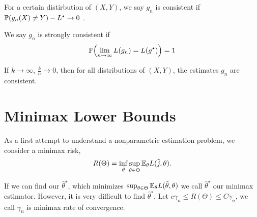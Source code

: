 \begin{defn}
  \label{defn:nearest_neighbour_classification:2}
  For a certain distirbution of $(X, Y)$, we say $g_{n}$ is consistent
  if $\Prob{g_{n}(X) \neq Y} - L^{\star} \rightarrow 0$ .

  We say $g_{n}$ is strongly consistent if
  \begin{equation}
    \label{eq:97}
    \Prob{\lim_{n \rightarrow \infty} L(g_{n}) = L(g^{\star})} = 1
  \end{equation}
\end{defn}

\begin{thm}
  \label{defn:nearest_neighbour_classification:3}
  If $k \rightarrow \infty$, $\frac{k}{n} \rightarrow 0$, then for all
  distributions of $(X, Y)$, the \knn estimates $g_{n}$ are consistent.
\end{thm}

\section{Minimax Lower Bounds}
\label{sec:minimax-lower-bounds}


\begin{defn}
  \label{sec:minimax-lower-bounds-1}
  As a first attempt to understand a nonparametric estimation problem,
  we consider a minimax risk,
  \begin{equation}
    \label{eq:105}
    R(\Theta) = \inf_{\tilde \theta} \sup_{\theta \in \Theta}
    \E_{\theta} L(\tilde j, \theta).
  \end{equation}
\end{defn}

\begin{defn}
  \label{sec:minimax-lower-bounds-2}
  If we can find our $\hat \theta^{\star}$, which minimizes
  $\sup_{\theta \in \Theta} \E_{\theta} L(\tilde \theta, \theta)$ we
  call $\hat \theta^{\star}$ our minimax estimator. However, it is
  very difficult to find $\hat \theta^{\star}$. Let $c \gamma_{n} \leq
  R(\Theta) \leq C \gamma_{n}$, we call $\gamma_{n}$ is minimax rate
  of convergence.
\end{defn}

